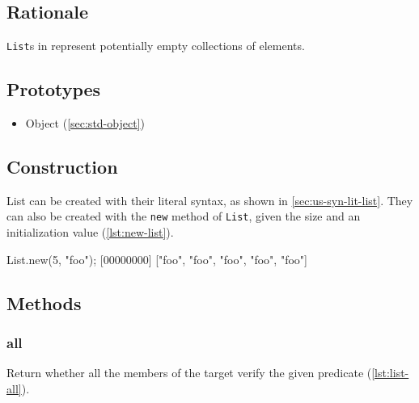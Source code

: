 \subsection{Rationale}

\lstinline|List|s in \us represent potentially empty collections of
elements.

\subsection{Prototypes}

\begin{itemize}
\item Object (\autoref{sec:std-object})
\end{itemize}

\subsection{Construction}

List can be created with their literal syntax, as shown in
\autoref{sec:us-syn-lit-list}. They can also be created with the
\lstinline|new| method of \lstinline|List|, given the size and an
initialization value (\autoref{lst:new-list}).

\begin{urbiscript}[caption=List.new, label=lst:new-list,
  float=\floatposh]
  List.new(5, "foo");
  [00000000] ["foo", "foo", "foo", "foo", "foo"]
\end{urbiscript}

\subsection{Methods}

\subsubsection{all}

Return whether all the members of the target verify the given
predicate (\autoref{lst:list-all}).


